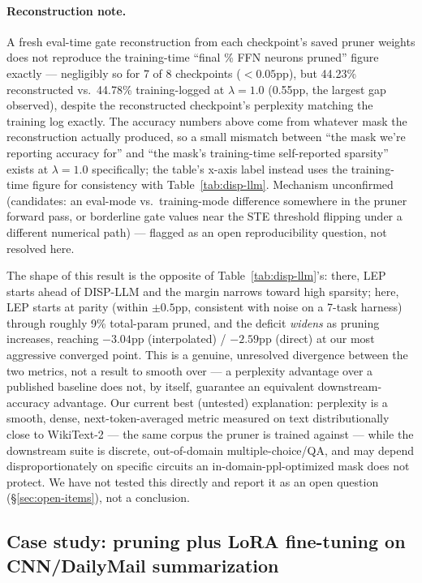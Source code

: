 \documentclass[11pt]{article}
\begin{document}
\paragraph{Reconstruction note.} A fresh eval-time gate reconstruction from each
checkpoint's saved pruner weights does not reproduce the training-time
``final \% FFN neurons pruned'' figure exactly --- negligibly so for 7 of 8
checkpoints ($<0.05$pp), but 44.23\% reconstructed vs.\ 44.78\% training-logged
at $\lambda=1.0$ (0.55pp, the largest gap observed), despite the reconstructed
checkpoint's perplexity matching the training log exactly. The accuracy
numbers above come from whatever mask the reconstruction actually produced,
so a small mismatch between ``the mask we're reporting accuracy for'' and ``the
mask's training-time self-reported sparsity'' exists at $\lambda=1.0$
specifically; the table's x-axis label instead uses the training-time figure
for consistency with Table~\ref{tab:disp-llm}. Mechanism unconfirmed (candidates: an
eval-mode vs.\ training-mode difference somewhere in the pruner forward pass,
or borderline gate values near the STE threshold flipping under a different
numerical path) --- flagged as an open reproducibility question, not resolved
here.

The shape of this result is the opposite of Table~\ref{tab:disp-llm}'s: there, LEP starts
ahead of DISP-LLM and the margin narrows toward high sparsity; here, LEP
starts at parity (within $\pm0.5$pp, consistent with noise on a 7-task
harness) through roughly 9\% total-param pruned, and the deficit \emph{widens} as
pruning increases, reaching $-3.04$pp (interpolated) / $-2.59$pp (direct) at
our most aggressive converged point. This is a genuine, unresolved
divergence between the two metrics, not a result to smooth over --- a
perplexity advantage over a published baseline does not, by itself,
guarantee an equivalent downstream-accuracy advantage. Our current best
(untested) explanation: perplexity is a smooth, dense, next-token-averaged
metric measured on text distributionally close to WikiText-2 --- the same
corpus the pruner is trained against --- while the downstream suite is
discrete, out-of-domain multiple-choice/QA, and may depend disproportionately
on specific circuits an in-domain-ppl-optimized mask does not protect. We
have not tested this directly and report it as an open question (\S\ref{sec:open-items}), not
a conclusion.

\subsection{Case study: pruning plus LoRA fine-tuning on CNN/DailyMail summarization}
\label{sec:cnndailymail}
\end{document}
